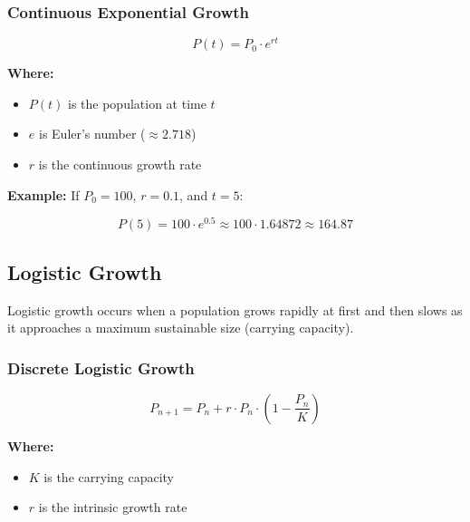 \subsubsection{Continuous Exponential Growth}

\[
P(t) = P_0 \cdot e^{rt}
\]

\textbf{Where:}
\begin{itemize}[label=\(-\)]
  \item \(P(t)\) is the population at time \(t\)
  \item \(e\) is Euler’s number (\(\approx 2.718\))
  \item \(r\) is the continuous growth rate
\end{itemize}

\textbf{Example:}  
If \(P_0 = 100\), \(r = 0.1\), and \(t = 5\):

\[
P(5) = 100 \cdot e^{0.5} \approx 100 \cdot 1.64872 \approx 164.87
\]

\begin{center}
\end{center}

\subsection{Logistic Growth}

Logistic growth occurs when a population grows rapidly at first and then slows as it approaches a maximum sustainable size (carrying capacity).

\subsubsection{Discrete Logistic Growth}

\[
P_{n+1} = P_n + r \cdot P_n \cdot \left(1 - \frac{P_n}{K}\right)
\]

\textbf{Where:}
\begin{itemize}[label=\(-\)]
  \item \(K\) is the carrying capacity
  \item \(r\) is the intrinsic growth rate
\end{itemize}

